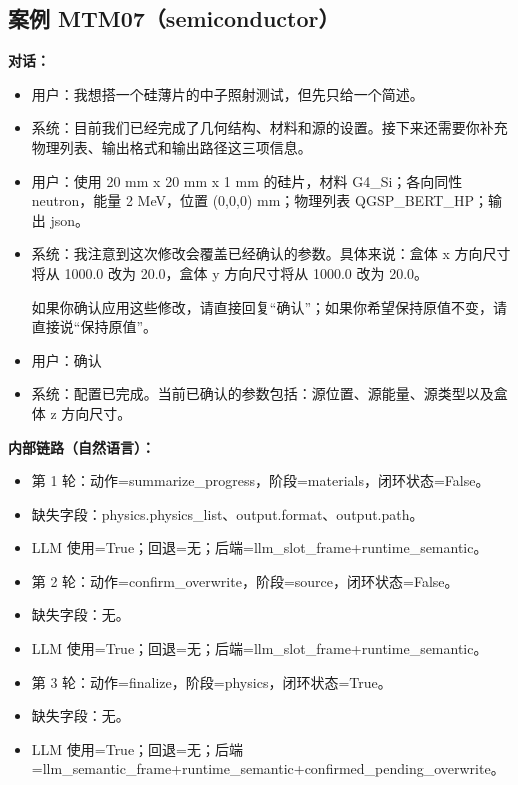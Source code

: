 \documentclass[11pt]{ctexart}
\begin{document}
\subsection{案例 MTM07（semiconductor）}
\textbf{对话：}
\begin{itemize}
\item 用户：我想搭一个硅薄片的中子照射测试，但先只给一个简述。
\item 系统：目前我们已经完成了几何结构、材料和源的设置。接下来还需要你补充物理列表、输出格式和输出路径这三项信息。
\item 用户：使用 20 mm x 20 mm x 1 mm 的硅片，材料 G4\_Si；各向同性 neutron，能量 2 MeV，位置 (0,0,0) mm；物理列表 QGSP\_BERT\_HP；输出 json。
\item 系统：我注意到这次修改会覆盖已经确认的参数。具体来说：盒体 x 方向尺寸将从 1000.0 改为 20.0，盒体 y 方向尺寸将从 1000.0 改为 20.0。

如果你确认应用这些修改，请直接回复“确认”；如果你希望保持原值不变，请直接说“保持原值”。
\item 用户：确认
\item 系统：配置已完成。当前已确认的参数包括：源位置、源能量、源类型以及盒体 z 方向尺寸。
\end{itemize}
\textbf{内部链路（自然语言）：}
\begin{itemize}
\item 第 1 轮：动作=summarize\_progress，阶段=materials，闭环状态=False。
\item 缺失字段：physics.physics\_list、output.format、output.path。
\item LLM 使用=True；回退=无；后端=llm\_slot\_frame+runtime\_semantic。
\item 第 2 轮：动作=confirm\_overwrite，阶段=source，闭环状态=False。
\item 缺失字段：无。
\item LLM 使用=True；回退=无；后端=llm\_slot\_frame+runtime\_semantic。
\item 第 3 轮：动作=finalize，阶段=physics，闭环状态=True。
\item 缺失字段：无。
\item LLM 使用=True；回退=无；后端=llm\_semantic\_frame+runtime\_semantic+confirmed\_pending\_overwrite。
\end{itemize}
\end{document}
